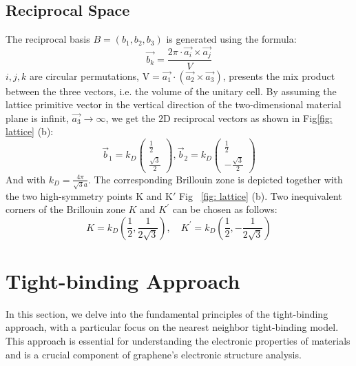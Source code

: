 \subsection{Reciprocal Space}
The reciprocal basis $B=\left(b_{1}, b_{2}, b_{3}\right)$ is generated using the formula:
$$
\overrightarrow{b_{k}}=\frac{2 \pi \cdot \overrightarrow{a_{i}} \times \overrightarrow{a_{j}}}{V}
$$
$i, j, k$ are circular permutations, $\mathrm{V}=\overrightarrow{a_{1}}\cdot (\overrightarrow{a_{2}}
\times \overrightarrow{a_3})$, presents the mix product between the three vectors, i.e. the volume
of the unitary cell.  By assuming the lattice primitive vector in the vertical direction of the
two-dimensional material plane is infinit, $\overrightarrow{a_{3}}\to\infty$, we get the $2 \mathrm{D}$ reciprocal vectors as shown in Fig\ref{fig: lattice} (b):
$$
\vec b_{1}=k_{D}\left(\begin{array}{l}
\frac{1}{2} \\
\frac{\sqrt{3}}{2} 
\end{array}\right),
\vec b_{2}=k_{D}\left(\begin{array}{c}
\frac{1}{2} \\
-\frac{\sqrt{3}}{2} 
\end{array}\right)
$$
And with $k_{D}=\frac{4 \pi}{\sqrt{3} a}$. The corresponding Brillouin zone is depicted together with the two high-symmetry points $\mathrm{K}$ and $\mathrm{K'}$ Fig ~\ref{fig: lattice} (b).
Two inequivalent corners of the Brillouin zone $K$ and $K^{\prime}$ can be chosen as follows:
$$
K=k_{D}\left(\frac{1}{2}, \frac{1}{2 \sqrt{3}}\right), \quad K^{\prime}=k_{D}\left(\frac{1}{2},-\frac{1}{2 \sqrt{3}}\right)
$$

\section{Tight-binding Approach \label{sec:tightbinding}}

In this section, we delve into the fundamental principles of the tight-binding approach, with a particular focus on the nearest neighbor tight-binding model. This approach is essential for understanding the electronic properties of materials and is a crucial component of graphene's electronic structure analysis.

